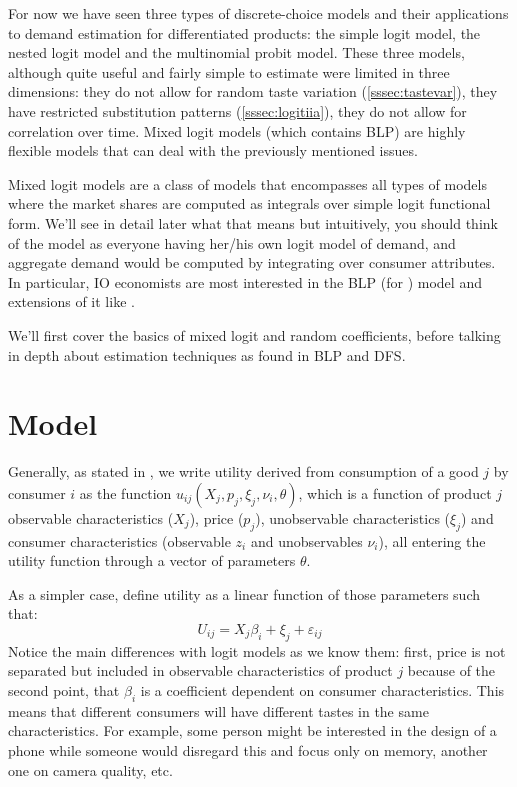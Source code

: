 For now we have seen three types of discrete-choice models and their applications to demand estimation for differentiated products: the simple logit model, the nested logit model and the multinomial probit model. These three models, although quite useful and fairly simple to estimate were limited in three dimensions: they do not allow for random taste variation (\ref{sssec:tastevar}), they have restricted substitution patterns (\ref{sssec:logitiia}),  they do not allow for correlation over time. Mixed logit models (which contains BLP) are highly flexible models that can deal with the previously mentioned issues.

Mixed logit models are a class of models that encompasses all types of models where the market shares are computed as integrals over simple logit functional form. We'll see in detail later what that means but intuitively, you should think of the model as everyone having her/his own logit model of demand, and aggregate demand would be computed by integrating over consumer attributes. In particular, IO economists are most interested in the BLP (for \cite{blp_95}) model and extensions of it like \cite{dfs_12}.

We'll first cover the basics of mixed logit and random coefficients, before talking in depth about estimation techniques as found in BLP and DFS.

\section{Model}

Generally, as stated in \cite{blp_95}, we write utility derived from consumption of a good $j$ by consumer $i$ as the function $u_{ij}(X_j, p_j, \xi_j, \nu_i, \theta)$, which is a function of product $j$ observable characteristics ($X_j$), price ($p_j$), unobservable characteristics ($\xi_j$) and consumer characteristics (observable $z_i$ and unobservables $\nu_i$), all entering the utility function through a vector of parameters $\theta$. 

As a simpler case, define utility as a linear function of those parameters such that: $$U_{ij} = X_j\beta_i + \xi_j + \varepsilon_{ij} $$ Notice the main differences with logit models as we know them: first, price is not separated but included in observable characteristics of product $j$ because of the second point, that $\beta_i$ is a coefficient dependent on consumer characteristics. This means that different consumers will have different tastes in the same characteristics. For example, some person might be interested in the design of a phone while someone would disregard this and focus only on memory, another one on camera quality, etc.

